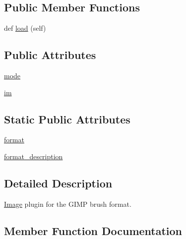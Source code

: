 \subsection*{Public Member Functions}
\begin{DoxyCompactItemize}
\item 
def \hyperlink{classPIL_1_1GbrImagePlugin_1_1GbrImageFile_a95ec6b6ffb3cd3922bd138a6e216c199}{load} (self)
\end{DoxyCompactItemize}
\subsection*{Public Attributes}
\begin{DoxyCompactItemize}
\item 
\hyperlink{classPIL_1_1GbrImagePlugin_1_1GbrImageFile_ac8a881bc1d821b1f94b6cbac9ac53436}{mode}
\item 
\hyperlink{classPIL_1_1GbrImagePlugin_1_1GbrImageFile_a4287c30dc4fd4864ac7284dc2a756b66}{im}
\end{DoxyCompactItemize}
\subsection*{Static Public Attributes}
\begin{DoxyCompactItemize}
\item 
\hyperlink{classPIL_1_1GbrImagePlugin_1_1GbrImageFile_a9e7a702162d0caa740ee2ff25045c84a}{format}
\item 
\hyperlink{classPIL_1_1GbrImagePlugin_1_1GbrImageFile_a8c6145c3374c5db6cbc1b6e56047e0cb}{format\+\_\+description}
\end{DoxyCompactItemize}


\subsection{Detailed Description}
\hyperlink{namespacePIL_1_1Image}{Image} plugin for the G\+I\+MP brush format. 



\subsection{Member Function Documentation}
\mbox{\label{classPIL_1_1GbrImagePlugin_1_1GbrImageFile_a95ec6b6ffb3cd3922bd138a6e216c199}} 
